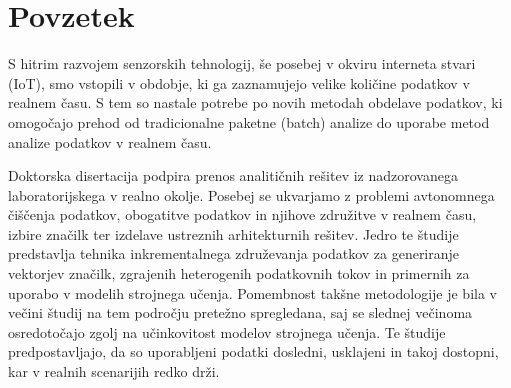 % 
\chapter*{Povzetek}

S hitrim razvojem senzorskih tehnologij, še posebej v okviru interneta stvari (IoT), smo vstopili v obdobje, ki ga zaznamujejo velike količine podatkov v realnem času. 
S tem so nastale potrebe po novih metodah obdelave podatkov, ki omogočajo prehod od tradicionalne paketne (batch) analize do uporabe metod analize podatkov v realnem času.

Doktorska disertacija podpira prenos analitičnih rešitev iz nadzorovanega laboratorijskega v realno okolje. 
Posebej se ukvarjamo z problemi avtonomnega čiščenja podatkov, obogatitve podatkov in njihove združitve v realnem času, izbire značilk ter izdelave ustreznih arhitekturnih rešitev.
Jedro te študije predstavlja tehnika inkrementalnega združevanja podatkov za generiranje vektorjev značilk, zgrajenih heterogenih podatkovnih tokov in primernih za uporabo v modelih strojnega učenja.
Pomembnost takšne metodologije je bila v večini študij na tem področju pretežno spregledana, saj se slednej večinoma osredotočajo zgolj na učinkovitost modelov strojnega učenja.
Te študije predpostavljajo, da so uporabljeni podatki dosledni, usklajeni in takoj dostopni, kar v realnih scenarijih redko drži.

